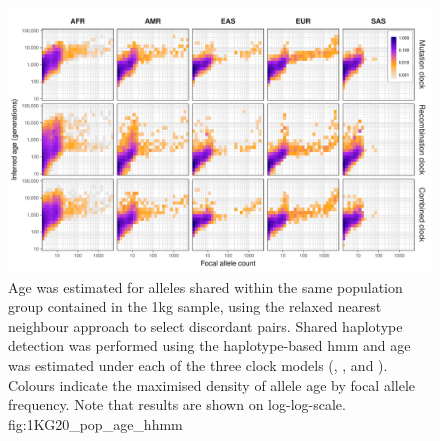 

\begin{figure}[!htb]
\centering
\includegraphics[width=\textwidth]{./img/ch5/1KG20_pop_age_hhmm}
%
{Age was estimated for alleles shared within the same population group contained in the \gls{1kg} sample, using the relaxed nearest neighbour approach to select discordant pairs.
Shared haplotype detection was performed using the haplotype-based \gls{hmm} and age was estimated under each of the three clock models (\ClockM, \ClockR, and \ClockC).
Colours indicate the maximised density of allele age by focal allele frequency.
Note that results are shown on log-log-scale.}%
{fig:1KG20_pop_age_hhmm}
\end{figure}

